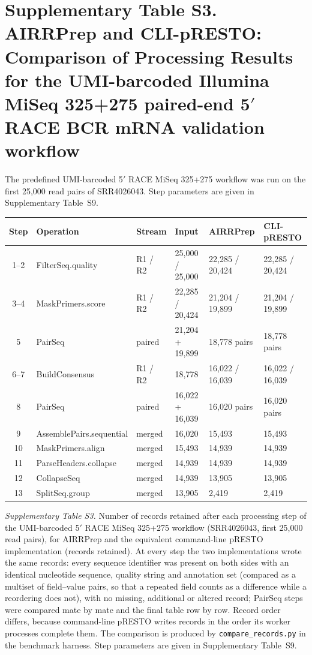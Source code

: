\documentclass[11pt]{article}
\begin{document}
\clearpage
\section*{Supplementary Table S3. AIRRPrep and CLI-pRESTO: Comparison of Processing Results for the UMI-barcoded Illumina MiSeq 325+275 paired-end 5$'$ RACE BCR mRNA validation workflow}
The predefined UMI-barcoded 5$'$ RACE MiSeq 325+275 workflow was run on the
first 25,000 read pairs of SRR4026043. Step parameters are given in
Supplementary Table~S9.

\begin{center}
\small
\begin{tabular}{clllll}
\toprule
\textbf{Step} & \textbf{Operation} & \textbf{Stream} & \textbf{Input} & \textbf{AIRRPrep} & \textbf{CLI-pRESTO} \\
\midrule
1--2 & FilterSeq.quality & R1 / R2 & 25,000 / 25,000 & 22,285 / 20,424 & 22,285 / 20,424 \\
3--4 & MaskPrimers.score & R1 / R2 & 22,285 / 20,424 & 21,204 / 19,899 & 21,204 / 19,899 \\
5 & PairSeq & paired & 21,204 + 19,899 & 18,778 pairs & 18,778 pairs \\
6--7 & BuildConsensus & R1 / R2 & 18,778 & 16,022 / 16,039 & 16,022 / 16,039 \\
8 & PairSeq & paired & 16,022 + 16,039 & 16,020 pairs & 16,020 pairs \\
9 & AssemblePairs.sequential & merged & 16,020 & 15,493 & 15,493 \\
10 & MaskPrimers.align & merged & 15,493 & 14,939 & 14,939 \\
11 & ParseHeaders.collapse & merged & 14,939 & 14,939 & 14,939 \\
12 & CollapseSeq & merged & 14,939 & 13,905 & 13,905 \\
13 & SplitSeq.group & merged & 13,905 & 2,419 & 2,419 \\
\bottomrule
\end{tabular}
\end{center}

{\small\textit{Supplementary Table S3.} Number of records retained after each
processing step of the UMI-barcoded 5$'$ RACE MiSeq 325+275 workflow
(SRR4026043, first 25,000 read pairs), for AIRRPrep and the equivalent
command-line pRESTO implementation (records retained). At every step the two
implementations wrote the same records: every sequence identifier was present
on both sides with an identical nucleotide sequence, quality string and
annotation set (compared as a multiset of field--value pairs, so that a
repeated field counts as a difference while a reordering does not), with no
missing, additional or altered record; PairSeq steps were compared mate by mate
and the final table row by row. Record order differs, because command-line pRESTO writes records in
the order its worker processes complete them. The comparison is produced by
\texttt{compare\_records.py} in the benchmark harness. Step parameters are given
in Supplementary Table~S9.\par}
\end{document}
